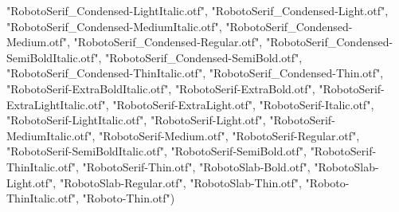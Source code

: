 \documentclass[
]{article}
\newenvironment{Shaded}{\begin{snugshade}}{\end{snugshade}}
\newcommand{\NormalTok}[1]{#1}
\newcommand{\StringTok}[1]{\textcolor[rgb]{0.31,0.60,0.02}{#1}}
\begin{document}
\begin{Shaded}
\begin{Highlighting}[]
  \StringTok{"RobotoSerif\_Condensed{-}LightItalic.otf"}\NormalTok{,}
  \StringTok{"RobotoSerif\_Condensed{-}Light.otf"}\NormalTok{,}
  \StringTok{"RobotoSerif\_Condensed{-}MediumItalic.otf"}\NormalTok{,}
  \StringTok{"RobotoSerif\_Condensed{-}Medium.otf"}\NormalTok{,}
  \StringTok{"RobotoSerif\_Condensed{-}Regular.otf"}\NormalTok{,}
  \StringTok{"RobotoSerif\_Condensed{-}SemiBoldItalic.otf"}\NormalTok{,}
  \StringTok{"RobotoSerif\_Condensed{-}SemiBold.otf"}\NormalTok{,}
  \StringTok{"RobotoSerif\_Condensed{-}ThinItalic.otf"}\NormalTok{,}
  \StringTok{"RobotoSerif\_Condensed{-}Thin.otf"}\NormalTok{,}
  \StringTok{"RobotoSerif{-}ExtraBoldItalic.otf"}\NormalTok{,}
  \StringTok{"RobotoSerif{-}ExtraBold.otf"}\NormalTok{,}
  \StringTok{"RobotoSerif{-}ExtraLightItalic.otf"}\NormalTok{,}
  \StringTok{"RobotoSerif{-}ExtraLight.otf"}\NormalTok{,}
  \StringTok{"RobotoSerif{-}Italic.otf"}\NormalTok{,}
  \StringTok{"RobotoSerif{-}LightItalic.otf"}\NormalTok{,}
  \StringTok{"RobotoSerif{-}Light.otf"}\NormalTok{,}
  \StringTok{"RobotoSerif{-}MediumItalic.otf"}\NormalTok{,}
  \StringTok{"RobotoSerif{-}Medium.otf"}\NormalTok{,}
  \StringTok{"RobotoSerif{-}Regular.otf"}\NormalTok{,}
  \StringTok{"RobotoSerif{-}SemiBoldItalic.otf"}\NormalTok{,}
  \StringTok{"RobotoSerif{-}SemiBold.otf"}\NormalTok{,}
  \StringTok{"RobotoSerif{-}ThinItalic.otf"}\NormalTok{,}
  \StringTok{"RobotoSerif{-}Thin.otf"}\NormalTok{,}
  \StringTok{"RobotoSlab{-}Bold.otf"}\NormalTok{,}
  \StringTok{"RobotoSlab{-}Light.otf"}\NormalTok{,}
  \StringTok{"RobotoSlab{-}Regular.otf"}\NormalTok{,}
  \StringTok{"RobotoSlab{-}Thin.otf"}\NormalTok{,}
  \StringTok{"Roboto{-}ThinItalic.otf"}\NormalTok{,}
  \StringTok{"Roboto{-}Thin.otf"}\NormalTok{)}
 
\end{Highlighting}
\end{Shaded}
\end{document}
